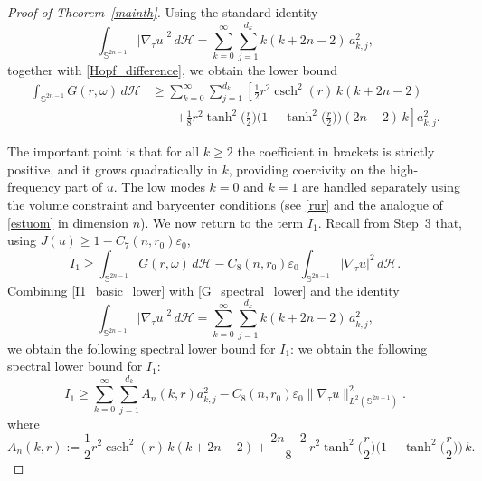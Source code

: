\documentclass[11pt]{amsart}
\newcommand{\csch}{\operatorname{csch}}
\numberwithin{equation}{section}
\def\ge{\geqslant}
\begin{document}
\begin{proof}[Proof of Theorem~\ref{mainth}]
\smallskip
Using the standard identity
\[
\int_{\mathbb S^{2n-1}}|\nabla_\tau u|^2\,d\mathcal H
=\sum_{k=0}^\infty\sum_{j=1}^{d_k} k(k+2n-2)\,a_{k,j}^2,
\]
together with \eqref{Hopf_difference}, we obtain the lower bound
\begin{equation}\label{G_spectral_lower}
\begin{split}
\int_{\mathbb S^{2n-1}} G(r,\omega)\, d\mathcal H
&\ge
\sum_{k=0}^\infty \sum_{j=1}^{d_k}
\left[
\frac12 r^2 \csch^2(r)\, k(k+2n-2)
\right.
\\
&\qquad\left.
+\frac18 r^2 \tanh^2\!\Big(\frac r2\Big)\Big(1-\tanh^2\!\Big(\frac r2\Big)\Big)
(2n-2)\, k
\right] a_{k,j}^2 .
\end{split}
\end{equation}


\smallskip
The important point is that for all $k\ge 2$ the coefficient in brackets is strictly positive,
and it grows quadratically in $k$, providing coercivity on the high-frequency part of $u$.
The low modes $k=0$ and $k=1$ are handled separately using the volume constraint and barycenter
conditions (see \eqref{rur} and the analogue of \eqref{estuom} in dimension $n$).
\smallskip
We now return to the term $I_1$. Recall from Step~3 that, using $J(u)\ge 1-C_7(n,r_0)\varepsilon_0$,
\begin{equation}\label{I1_basic_lower}
I_1 \ge \int_{\mathbb S^{2n-1}} G(r,\omega)\,d\mathcal H
- C_8(n,r_0)\varepsilon_0\int_{\mathbb S^{2n-1}}|\nabla_\tau u|^2\,d\mathcal H.
\end{equation}
Combining \eqref{I1_basic_lower} with \eqref{G_spectral_lower} and the identity
\[
\int_{\mathbb S^{2n-1}}|\nabla_\tau u|^2\,d\mathcal H
=\sum_{k=0}^\infty\sum_{j=1}^{d_k}k(k+2n-2)\,a_{k,j}^2,
\]
we obtain the following spectral lower bound for $I_1$:
we obtain the following spectral lower bound for $I_1$:
\begin{equation}\label{I1K_general}
I_1
\ge
\sum_{k=0}^\infty\sum_{j=1}^{d_k}A_n(k,r)a_{k,j}^2
- C_8(n,r_0)\varepsilon_0\|\nabla_\tau u\|_{L^2(\mathbb S^{2n-1})}^2.
\end{equation}
where
\[
A_n(k,r):=
\frac12 r^2 \csch^2(r)\,k(k+2n-2)
+\frac{2n-2}{8}\, r^2 \tanh^2\!\Big(\frac r2\Big)
\Big(1-\tanh^2\!\Big(\frac r2\Big)\Big)\,k .
\]


\medskip


\end{proof}
\end{document}
